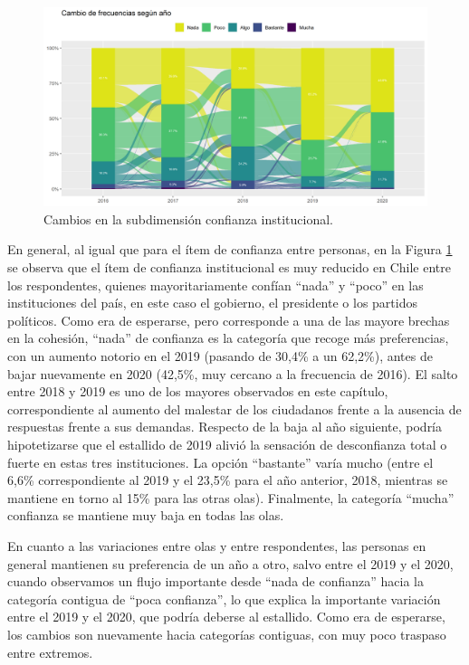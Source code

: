 \documentclass[
  12pt,
]{book}
\begin{document}
\begin{figure}[H]

{\centering \includegraphics[width=1\linewidth,height=1\textheight]{output/graphs/alluvial_conf_institucional} 

}

\caption{Cambios en la subdimensión confianza institucional.}\label{fig:alluvial-conf-institucional}
\end{figure}

En general, al igual que para el ítem de confianza entre personas, en la Figura \ref{fig:alluvial-conf-institucional} se observa que el ítem de confianza institucional es muy reducido en Chile entre los respondentes, quienes mayoritariamente confían ``nada'' y ``poco'' en las instituciones del país, en este caso el gobierno, el presidente o los partidos políticos. Como era de esperarse, pero corresponde a una de las mayore brechas en la cohesión, ``nada'' de confianza es la categoría que recoge más preferencias, con un aumento notorio en el 2019 (pasando de 30,4\% a un 62,2\%), antes de bajar nuevamente en 2020 (42,5\%, muy cercano a la frecuencia de 2016). El salto entre 2018 y 2019 es uno de los mayores observados en este capítulo, correspondiente al aumento del malestar de los ciudadanos frente a la ausencia de respuestas frente a sus demandas. Respecto de la baja al año siguiente, podría hipotetizarse que el estallido de 2019 alivió la sensación de desconfianza total o fuerte en estas tres instituciones. La opción ``bastante'' varía mucho (entre el 6,6\% correspondiente al 2019 y el 23,5\% para el año anterior, 2018, mientras se mantiene en torno al 15\% para las otras olas). Finalmente, la categoría ``mucha'' confianza se mantiene muy baja en todas las olas.

En cuanto a las variaciones entre olas y entre respondentes, las personas en general mantienen su preferencia de un año a otro, salvo entre el 2019 y el 2020, cuando observamos un flujo importante desde ``nada de confianza'' hacia la categoría contigua de ``poca confianza'', lo que explica la importante variación entre el 2019 y el 2020, que podría deberse al estallido. Como era de esperarse, los cambios son nuevamente hacia categorías contiguas, con muy poco traspaso entre extremos.
\end{document}
